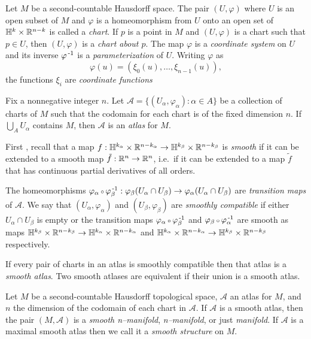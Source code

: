 \begin{defn}[Coordinates]
	\label{def:coordinates}
	Let $M$ be a second-countable Hausdorff space.
	The pair $(U,\varphi)$ where $U$ is an open subset of $M$ and $\varphi$ is a homeomorphism from $U$ onto an open set of $\mathbb{H}^k\times\mathbb{R}^{n-k}$ is called a \emph{chart}.
	If $p$ is a point in $M$ and $(U,\varphi)$ is a chart such that $p\in U$, then $(U,\varphi)$ is a \emph{chart about $p$}.
	The map $\varphi$ is a \emph{coordinate system} on $U$ and its inverse $\varphi^{\,\text{-}1}$ is a \emph{parameterization} of $U$.
	Writing $\varphi$ as
	\[
		\varphi(u) = (\xi_0(u),\dots,\xi_{n-1}(u)),
	\]
	the functions $\xi_i$ are \emph{coordinate functions}	
\end{defn}

\begin{defn}[Atlas]
	\label{def:atlas}
	Fix a nonnegative integer $n$.
	Let $\mathcal{A}=\{(U_\alpha,\varphi_\alpha):\alpha\in A\}$ be a collection of charts of $M$ such that the codomain for each chart is of the fixed dimension $n$.
	If $\bigcup_A U_\alpha$ contains $M$, then $\mathcal{A}$ is an \emph{atlas} for $M$.
	
	First , recall that a map $f:\mathbb{H}^{k_\alpha}\times\mathbb{R}^{n-k_\alpha}\to\mathbb{H}^{k_\beta}\times\mathbb{R}^{n-k_\beta}$ is \emph{smooth} if it can be extended to a smooth map $\tilde{f}:\mathbb{R}^n\to\mathbb{R}^n$, i.e.\ if it can be extended to a map $\tilde{f}$ that has continuous partial derivatives of all orders.
	
	The homeomorphisms $\varphi_\alpha\comp \varphi_\beta\inv:\varphi_\beta(U_\alpha\cap U_\beta)\to \varphi_\alpha(U_\alpha\cap U_\beta)$ are \emph{transition maps} of $\mathcal{A}$.
	We say that $(U_\alpha,\varphi_\alpha)$ and $(U_\beta,\varphi_\beta)$ are \emph{smoothly compatible} if either $U_\alpha\cap U_\beta$ is empty or the transition maps $\varphi_\alpha\comp \varphi_\beta\inv$ and $\varphi_\beta\comp \varphi_\alpha\inv$ are smooth as maps $\mathbb{H}^{k_\beta}\times\mathbb{R}^{n-k_\beta}\to\mathbb{H}^{k_\alpha}\times\mathbb{R}^{n-k_\alpha}$ and  $\mathbb{H}^{k_\alpha}\times\mathbb{R}^{n-k_\alpha}\to\mathbb{H}^{k_\beta}\times\mathbb{R}^{n-k_\beta}$ respectively.

	If every pair of charts in an atlas is smoothly compatible then that atlas is a \emph{smooth atlas}.
	Two smooth atlases are equivalent if their union is a smooth atlas.
\end{defn}

\begin{defn}[Manifold]
	\label{def:manifold}
	Let $M$ be a second-countable Hausdorff topological space, $\mathcal{A}$ an atlas for $M$, and $n$ the dimension of the codomain of each chart in $\mathcal{A}$.
	If $\mathcal{A}$ is a smooth atlas, then the pair $(M,\mathcal{A})$ is a \emph{smooth n--manifold},  \emph{n--manifold}, or just \emph{manifold}.
	If $\mathcal{A}$ is a maximal smooth atlas then we call it a \emph{smooth structure} on $M$.
\end{defn}

